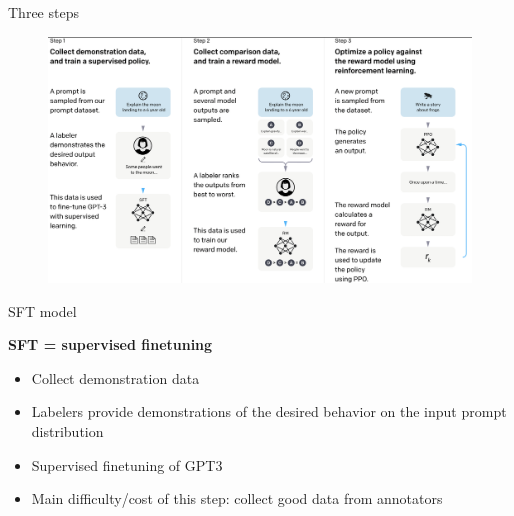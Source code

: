 \begin{vbframe}{Three steps}


\begin{figure}
\centering
\includegraphics[width = 12cm]{figure/threesteps.png}
\end{figure}


\end{vbframe}

\begin{vbframe}{SFT model}

\vfill

\textbf{SFT = supervised finetuning}

	\begin{itemize}
	\item Collect demonstration data
        \item Labelers provide demonstrations of the
          desired behavior on the input prompt distribution
\item Supervised finetuning of GPT3
\item Main difficulty/cost of this step: collect good data from annotators                  
	\end{itemize}

\vfill

\end{vbframe}

